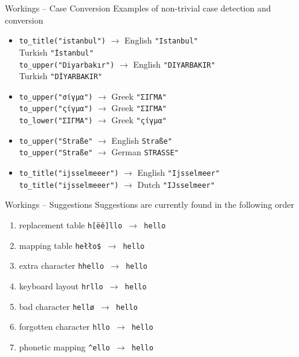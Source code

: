 \documentclass{beamer}
\begin{document}
\begin{frame}{Workings – Case Conversion}
Examples of non-trivial case detection and conversion
\begin{itemize}
\item \texttt{to\_title("\alert{i}stanbul")} $\rightarrow$ \hfill English \texttt{"\alert{I}stanbul"}\\
\hfill Turkish \texttt{"\alert{İ}stanbul"}\\
\texttt{to\_upper("D\alert{i}yarbak\alert{ı}r")} $\rightarrow$ \hfill English \texttt{"D\alert{I}YARBAK\alert{I}R"}\\
\hfill Turkish \texttt{"D\alert{İ}YARBAK\alert{I}R"}\\
\item \texttt{to\_upper("{\alert{σ}ίγμα}")} $\rightarrow$ \hfill Greek \texttt{"{\alert{Σ}ΙΓΜΑ}"}\\
\texttt{to\_upper("{\alert{ς}ίγμα}")} $\rightarrow$ \hfill Greek \texttt{"{\alert{Σ}ΙΓΜΑ}"}\\
\texttt{to\_lower("{\alert{Σ}ΙΓΜΑ}")} $\rightarrow$ \hfill Greek \texttt{"{\alert{ς}ίγμα}"}\\
\item \texttt{to\_upper("Stra\alert{ß}e"} $\rightarrow$ \hfill English \texttt{Stra\alert{ß}e"}\\
\texttt{to\_upper("Stra\alert{ß}e"} $\rightarrow$ \hfill German \texttt{STRA\alert{SS}E"}
\item \texttt{to\_title("\alert{ij}sselmeeer")} $\rightarrow$ \hfill English \texttt{"\alert{Ij}sselmeer"}\\
\texttt{to\_title("\alert{ij}sselmeeer")} $\rightarrow$ \hfill Dutch \texttt{"\alert{IJ}sselmeer"}
\end{itemize}
\end{frame}

\begin{frame}{Workings – Suggestions}
Suggestions are currently found in the following order
\begin{enumerate}
\item replacement table \hfill \texttt{h\alert{[ëê]}llo $\rightarrow$ h\alert{e}llo}
\item mapping table \hfill \texttt{he\alert{łło\$} $\rightarrow$ he\alert{llo}}
\item extra character \hfill \texttt{h\alert{h}ello $\rightarrow$ hello}
\item keyboard layout \hfill \texttt{h\alert{r}llo $\rightarrow$ h\alert{e}llo}
\item bad character \hfill \texttt{hell\alert{ø} $\rightarrow$ hell\alert{o}}
\item forgotten character \hfill \texttt{hllo $\rightarrow$ h\alert{e}llo}
\item phonetic mapping \hfill \texttt{\alert{\^{}el}lo $\rightarrow$ \alert{hel}lo}
\end{enumerate}
\end{frame}
\end{document}
